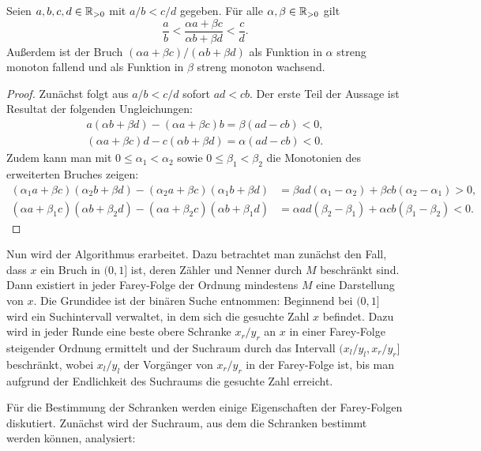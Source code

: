 \begin{lemma}\label{lemma-fraction-helpers}
	Seien $a,b,c,d\in\mathbb{R}_{>0}$ mit $a/b < c/d$ gegeben.
	Für alle $\alpha, \beta \in\mathbb{R}_{>0}$ gilt
	\[
		\frac{a}{b} < \frac{\alpha a + \beta c}{\alpha b + \beta d} < \frac{c}{d}.
	\]
	Außerdem ist der Bruch $(\alpha a + \beta c)/(\alpha b + \beta d)$ als Funktion in $\alpha$ streng monoton fallend und als Funktion in $\beta$ streng monoton wachsend.
\end{lemma}
\begin{proof}
	Zunächst folgt aus $a/b < c/d$ sofort $ad<cb$.
	Der erste Teil der Aussage ist Resultat der folgenden Ungleichungen:
	\begin{align*}
		a(\alpha b + \beta d) - (\alpha a + \beta c)b = \beta(ad - cb) < 0,\\[1em]
		(\alpha a + \beta c)d - c(\alpha b + \beta d) = \alpha(ad - cb) < 0.
	\end{align*}
	Zudem kann man mit $0\leq\alpha_1< \alpha_2$ sowie $0\leq\beta_1< \beta_2$ die Monotonien des erweiterten Bruches zeigen:
	\begin{align*}
		(\alpha_1 a + \beta c)(\alpha_2 b + \beta d) - (\alpha_2a + \beta c)(\alpha_1 b + \beta d) &= \beta a d(\alpha_1 - \alpha_2) + \beta c b (\alpha_2 - \alpha_1) > 0, \\[1em]
		(\alpha a + \beta_1 c)(\alpha b + \beta_2 d) - (\alpha a + \beta_2c)(\alpha b + \beta_1 d) &= \alpha ad(\beta_2 - \beta_1) + \alpha cb(\beta_1 - \beta_2) < 0.
	\end{align*}
\end{proof}

Nun wird der Algorithmus erarbeitet.
Dazu betrachtet man zunächst den Fall, dass $x$ ein Bruch in $(0,1]$ ist, deren Zähler und Nenner durch $M$ beschränkt sind.
Dann existiert in jeder Farey-Folge der Ordnung mindestens $M$ eine Darstellung von $x$.
Die Grundidee ist der binären Suche entnommen:
Beginnend bei $(0,1]$ wird ein Suchintervall verwaltet, in dem sich die gesuchte Zahl $x$ befindet.
Dazu wird in jeder Runde eine beste obere Schranke $x_r/y_r$ an $x$ in einer Farey-Folge steigender Ordnung ermittelt und der Suchraum durch das Intervall $(x_l/y_l, x_r/y_r]$ beschränkt, wobei $x_l/y_l$ der Vorgänger von $x_r/y_r$ in der Farey-Folge ist, bis man aufgrund der Endlichkeit des Suchraums die gesuchte Zahl erreicht.

Für die Bestimmung der Schranken werden einige Eigenschaften der Farey-Folgen diskutiert.
Zunächst wird der Suchraum, aus dem die Schranken bestimmt werden können, analysiert:

